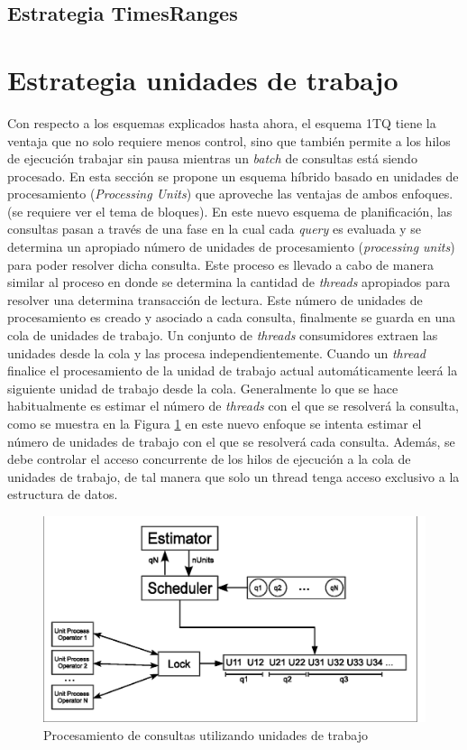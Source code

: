 \subsection{Estrategia TimesRanges}
\label{scheduling:fr}


\section{Estrategia unidades de trabajo}
\label{scheduling:unidadestrabajo}
Con respecto a los esquemas explicados hasta ahora, el esquema 1TQ tiene la ventaja que no solo requiere menos control, sino que también permite a los hilos de ejecución trabajar sin pausa mientras un \textit{batch} de consultas está siendo procesado. En esta sección se propone un esquema híbrido basado en unidades de procesamiento (\textit{Processing Units}) que aproveche las ventajas de ambos enfoques. (se requiere ver el tema de bloques).
En este nuevo esquema de planificación, las consultas pasan a través de una fase en la cual cada \textit{query} es evaluada y se determina un apropiado número de unidades de procesamiento (\textit{processing units}) para poder resolver dicha consulta. Este proceso es llevado a cabo de manera similar al proceso en donde se determina la cantidad de \textit{threads} apropiados para resolver una determina transacción de lectura. Este número de unidades de procesamiento es creado y asociado a cada consulta, finalmente se guarda en una cola de unidades de trabajo. Un conjunto de \textit{threads} consumidores extraen las unidades desde la cola y las procesa independientemente. Cuando un \textit{thread} finalice el procesamiento de la unidad de trabajo actual automáticamente leerá la siguiente unidad de trabajo desde la cola. 
Generalmente lo que se hace habitualmente es estimar el número de \textit{threads} con el que se resolverá la consulta, como se muestra en la Figura \ref{fig:unit_process} en este nuevo enfoque se intenta estimar el número de unidades de trabajo con el que se resolverá cada consulta. Además, se debe controlar el acceso concurrente de los hilos de ejecución a la cola de unidades de trabajo, de tal manera que solo un thread tenga acceso exclusivo a la estructura de datos. 

\begin{figure}[!th]
\centering
\includegraphics[scale=.75]{images/unit_process.eps}
\caption{Procesamiento de consultas utilizando unidades de trabajo}
\label{fig:unit_process}
\end{figure}

